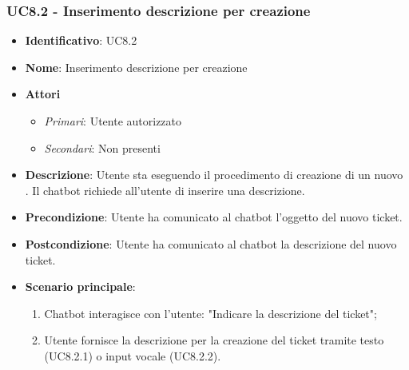 \subsubsection{UC8.2 - Inserimento descrizione per creazione }
\begin{itemize}
	\item \textbf{Identificativo}: UC8.2
	\item \textbf{Nome}: Inserimento descrizione per creazione  
	\item \textbf{Attori}
	\begin{itemize} 
		\item \textit{Primari}: Utente autorizzato
		\item \textit{Secondari}: Non presenti
	\end{itemize}
	\item \textbf{Descrizione}:  Utente sta eseguendo il procedimento di creazione di un nuovo . Il chatbot richiede all'utente di inserire una descrizione. 
	\item \textbf{Precondizione}: Utente ha comunicato al chatbot l'oggetto del nuovo ticket.
	\item \textbf{Postcondizione}: Utente ha comunicato al chatbot la descrizione del nuovo ticket.
	\item \textbf{Scenario principale}: \begin{enumerate}
		\item Chatbot interagisce con l'utente: "Indicare la descrizione del ticket";
		\item Utente fornisce la descrizione per la creazione del ticket tramite testo (UC8.2.1) o input vocale (UC8.2.2).
	\end{enumerate}
	\end{itemize}
